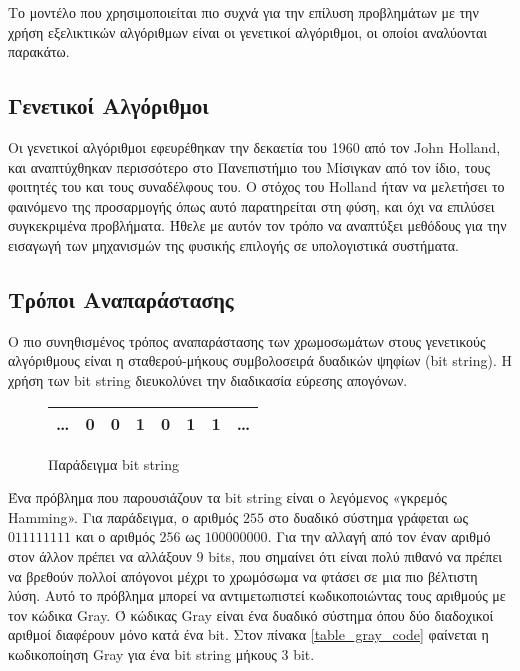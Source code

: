 Το μοντέλο που χρησιμοποιείται πιο συχνά για την επίλυση προβλημάτων με την χρήση εξελικτικών αλγόριθμων είναι οι γενετικοί αλγόριθμοι, οι οποίοι αναλύονται παρακάτω.

\subsection{Γενετικοί Αλγόριθμοι}

Οι γενετικοί αλγόριθμοι εφευρέθηκαν την δεκαετία του 1960 από τον John Holland, και αναπτύχθηκαν περισσότερο στο Πανεπιστήμιο του Μίσιγκαν από τον ίδιο, τους φοιτητές του και τους συναδέλφους του. Ο στόχος του Holland ήταν να μελετήσει το φαινόμενο της προσαρμογής όπως αυτό παρατηρείται στη φύση, και όχι να επιλύσει συγκεκριμένα προβλήματα. Ήθελε με αυτόν τον τρόπο να αναπτύξει μεθόδους για την εισαγωγή των μηχανισμών της φυσικής επιλογής σε υπολογιστικά συστήματα. \cite{Melanie1999}

\subsection{Τρόποι Αναπαράστασης}

Ο πιο συνηθισμένος τρόπος αναπαράστασης των χρωμοσωμάτων στους γενετικούς αλγόριθμους είναι η σταθερού-μήκους συμβολοσειρά δυαδικών ψηφίων (bit string). Η χρήση των bit string διευκολύνει την διαδικασία εύρεσης απογόνων.

\begin{figure}[!t]
    \renewcommand{\arraystretch}{1.3}
    \label{fig_bit_string}
    \centering
    \begin{tabular}{c|c|c|c|c|c|c|c}
        \hline
        \ldots & 0 & 0 & 1 & 0 & 1 & 1 & \ldots\\
        \hline
    \end{tabular}
    \caption{Παράδειγμα bit string}
\end{figure}

Ένα πρόβλημα που παρουσιάζουν τα bit string είναι ο λεγόμενος «γκρεμός Hamming». Για παράδειγμα, ο αριθμός $255$ στο δυαδικό σύστημα γράφεται ως $011111111$ και ο αριθμός $256$ ως $100000000$. Για την αλλαγή από τον έναν αριθμό στον άλλον πρέπει να αλλάξουν $9$ bits, που σημαίνει ότι είναι πολύ πιθανό να πρέπει να βρεθούν πολλοί απόγονοι μέχρι το χρωμόσωμα να φτάσει σε μια πιο βέλτιστη λύση. Αυτό το πρόβλημα μπορεί να αντιμετωπιστεί κωδικοποιώντας τους αριθμούς με τον κώδικα Gray. Ό κώδικας Gray είναι ένα δυαδικό σύστημα όπου δύο διαδοχικοί αριθμοί διαφέρουν μόνο κατά ένα bit. \cite{Lehre} Στον πίνακα \ref{table_gray_code} φαίνεται η κωδικοποίηση Gray για ένα bit string μήκους 3 bit.

